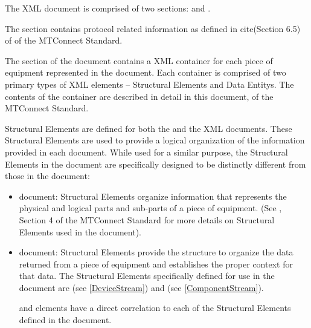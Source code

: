The  \gls{XML} document is comprised of two sections:  and .

The  section contains protocol related information as defined in {{cite(Section 6.5)}} of  of the MTConnect Standard.

The  section of the  document contains a \linebreak{} \gls{XML} container for each piece of equipment represented in the document.  Each  container is comprised of two primary types of \gls{XML} elements – \glspl{Structural Element} and \glspl{Data Entity}.  The contents of the  container are described in detail in this document,  of the MTConnect Standard.

\glspl{Structural Element} are defined for both the  and the  \gls{XML} documents.  These \glspl{Structural Element} are used to provide a logical organization of the information provided in each document.  While used for a similar purpose, the \glspl{Structural Element} in the  document are specifically designed to be distinctly different from those in the  document:  

\begin{itemize}

\item {} document: \glspl{Structural Element} organize information that represents the physical and logical parts and sub-parts of a piece of equipment.  (See , Section 4 of the MTConnect Standard for more details on \glspl{Structural Element} used in the  document).  

\item {} document: \glspl{Structural Element} provide the structure to organize the data returned from a piece of equipment and establishes the proper context for that data.  The \glspl{Structural Element} specifically defined for use in the  document are  (see \ref{DeviceStream}) and  (see \ref{ComponentStream}).   

 and  elements have a direct correlation to each of the \glspl{Structural Element} defined in the  document.
\end{itemize}

